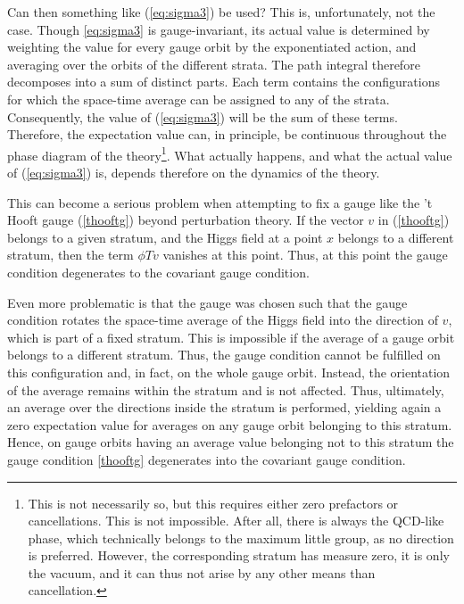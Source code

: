 \documentclass[final,twoside,12pt]{article}
\newcommand*{\pref}[1]{(\ref{#1})}
\newcommand*{\1}{1\!\!\!\bot}
\begin{document}
Can then something like \pref{eq:sigma3} be used? This is, unfortunately, not the case. Though \eqref{eq:sigma3} is gauge-invariant, its actual value is determined by weighting the value for every gauge orbit by the exponentiated action, and averaging over the orbits of the different strata. The path integral therefore decomposes into a sum of distinct parts. Each term contains the configurations for which the space-time average can be assigned to any of the strata. Consequently, the value of \pref{eq:sigma3} will be the sum of these terms. Therefore, the expectation value can, in principle, be continuous throughout the phase diagram of the theory\footnote{This is not necessarily so, but this requires either zero prefactors or cancellations. This is not impossible. After all, there is always the QCD-like phase, which technically belongs to the maximum little group, as no direction is preferred. However, the corresponding stratum has measure zero, it is only the vacuum, and it can thus not arise by any other means than cancellation.}. What actually happens, and what the actual value of \pref{eq:sigma3} is, depends therefore on the dynamics of the theory.

This can become a serious problem when attempting to fix a gauge like the 't Hooft gauge \pref{thooftg} beyond perturbation theory. If the vector $v$ in \pref{thooftg} belongs to a given stratum, and the Higgs field at a point $x$ belongs to a different stratum, then the term $\phi T v$ vanishes at this point. Thus, at this point the gauge condition degenerates to the covariant gauge condition.

Even more problematic is that the gauge was chosen such that the gauge condition rotates the space-time average of the Higgs field into the direction of $v$, which is part of a fixed stratum. This is impossible if the average of a gauge orbit belongs to a different stratum. Thus, the gauge condition cannot be fulfilled on this configuration and, in fact, on the whole gauge orbit. Instead, the orientation of the average remains within the stratum and is not affected. Thus, ultimately, an average over the directions inside the stratum is performed, yielding again a zero expectation value for averages on any gauge orbit belonging to this stratum. Hence, on gauge orbits having an average value belonging not to this stratum the gauge condition \eqref{thooftg} degenerates into the covariant gauge condition.
\end{document}
